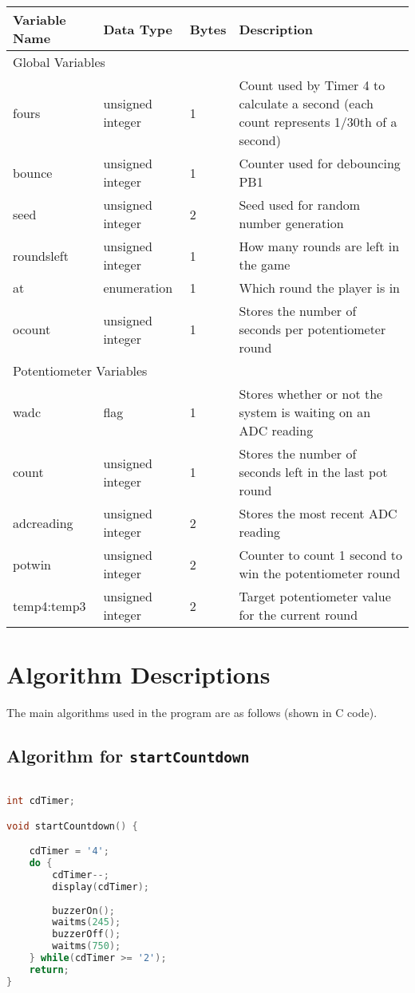 \documentclass[a4paper]{article}
\begin{document}
\begin{table}[H]
\centering
\label{tbl:dict}
\begin{tabular}{@{}lllp{9cm}@{}}
\toprule
Variable Name & Data Type        & Bytes & Description \\ \midrule
\multicolumn{4}{l}{Global Variables} \\ \midrule
fours         & unsigned integer & 1     & Count used by Timer 4 to calculate a second (each count represents 1/30th of a second) \\
bounce        & unsigned integer & 1     & Counter used for debouncing PB1 \\
seed          & unsigned integer & 2     & Seed used for random number generation \\
roundsleft    & unsigned integer & 1     & How many rounds are left in the game \\
at            & enumeration      & 1     & Which round the player is in \\
ocount        & unsigned integer & 1     & Stores the number of seconds per potentiometer round \\ \midrule
\multicolumn{4}{l}{Potentiometer Variables} \\ \midrule
wadc          & flag             & 1     & Stores whether or not the system is waiting on an ADC reading \\
count         & unsigned integer & 1     & Stores the number of seconds left in the last pot round \\
adcreading	& unsigned integer	& 2 & Stores the most recent ADC reading \\  
potwin		& unsigned integer	& 2	& Counter to count 1 second to win the potentiometer round \\ 
temp4:temp3	& unsigned integer	& 2	& Target potentiometer value for the current round \\

\bottomrule
\end{tabular}
\end{table}

\section{Algorithm Descriptions}

The main algorithms used in the program are as follows (shown in C code).

\subsection{Algorithm for \texttt{startCountdown}}
\begin{lstlisting}[language=C]

int cdTimer;

void startCountdown() {

	cdTimer = '4';
	do {
		cdTimer--;
		display(cdTimer);
		
		buzzerOn();
		waitms(245);
		buzzerOff();
		waitms(750);
	} while(cdTimer >= '2');
	return;
}		

\end{lstlisting}
\end{document}
